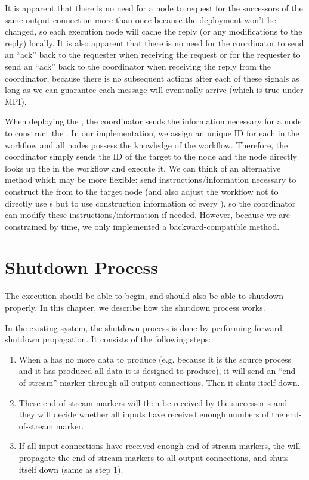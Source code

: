 It is apparent that there is no need for a node to request for the successors of the same output connection more than once because the deployment won't be changed, so each execution node will cache the reply (or any modifications to the reply) locally. It is also apparent that there is no need for the coordinator to send an ``ack'' back to the requester when receiving the request or for the requester to send an ``ack'' back to the coordinator when receiving the reply from the coordinator, because there is no subsequent actions after each of these signals as long as we can guarantee each message will eventually arrive (which is true under MPI).

When deploying the \tPEInst, the coordinator sends the information necessary for a node to construct the \tPEInst. In our implementation, we assign an unique ID for each \tPEInst in the workflow and all nodes possess the knowledge of the workflow. Therefore, the coordinator simply sends the ID of the target \tPEInst to the node and the node directly looks up the \tPEInst in the workflow and execute it. We can think of an alternative method which may be more flexible: send instructions/information necessary to construct the \tPEInst from \tPETmpl to the target node (and also adjust the workflow not to directly use \tPEInst{}s but to use construction information of every \tPEInst{}), so the coordinator can modify these instructions/information if needed. However, because we are constrained by time, we only implemented a backward-compatible method.

\section{Shutdown Process}
The execution should be able to begin, and should also be able to shutdown properly. In this chapter, we describe how the shutdown process works.

\newcommand{\dEOS}{end-of-stream\xspace}

In the existing \dpy system, the shutdown process is done by performing forward shutdown propagation. It consists of the following steps:
\begin{enumerate}
	\item When a \tPEInst has no more data to produce (e.g. because it is the source process and it has produced all data it is designed to produce), it will send an ``\dEOS'' marker through all output connections. Then it shuts itself down.
	\item These \dEOS markers will then be received by the successor \tPEInst{}s and they will decide whether all inputs have received enough numbers of the \dEOS marker.
	\item If all input connections have received enough \dEOS markers, the \tPEInst will propagate the \dEOS markers to all output connections, and shuts itself down (same as step 1).
\end{enumerate}

